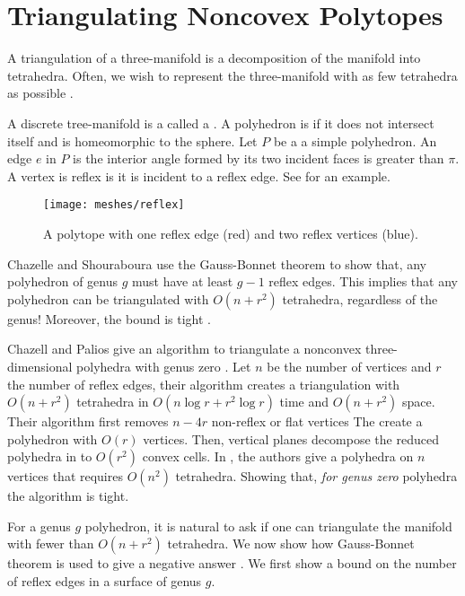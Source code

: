 \section{Triangulating Noncovex Polytopes}
\label{sec:triangulating}

A triangulation of a three-manifold is a decomposition
of the manifold into tetrahedra.
Often, we wish to represent the three-manifold
with as few tetrahedra as possible \cite{simplify-mesh-1999}.

A discrete tree-manifold is a called a . 
A polyhedron is  if it does not intersect itself and is homeomorphic to the sphere.
Let $P$ be a a simple polyhedron. An edge $e$ in $P$ is
 the interior angle formed by its two incident faces
is greater than $\pi$.
A vertex is reflex is it is incident to a reflex edge.
See  for an example.

\begin{figure}[htb]
\centering
\texttt{[image: meshes/reflex]}
\caption{A polytope with one reflex edge (red) and two reflex vertices (blue).}
\label{fig:reflex}
\end{figure}


Chazelle and Shouraboura use the 
 Gauss-Bonnet theorem to show that, any polyhedron
 of genus $g$ must have at least $g-1$ reflex edges.
 This implies that any polyhedron
can be triangulated with $O(n+r^2)$ tetrahedra, regardless  of 
the genus! Moreover, the bound is tight \cite{tetra-bounds-c-s-1994}.


Chazell and Palios give an
algorithm to triangulate a nonconvex three-dimensional polyhedra with genus
zero \cite{triangulating-polytope-1990}.
Let $n$ be the number of vertices and $r$ the number of reflex edges,
 their algorithm creates a triangulation with $O(n+r^2)$ tetrahedra 
in $O(n\log r +r^2\log r)$ time and $O(n+r^2)$ space.
Their algorithm first removes $n-4r$ non-reflex or flat vertices
The create a polyhedron with $O(r)$ vertices.
Then, vertical planes decompose the reduced polyhedra in to
$O(r^2)$ convex cells.
In \cite{7}, the authors give a polyhedra on $n$ vertices that requires
$O(n^2)$ tetrahedra. Showing that, \emph{for genus zero} polyhedra
the algorithm is tight.


For a genus $g$ polyhedron, it is natural to ask if one can 
triangulate the manifold with fewer than $O(n+r^2)$ tetrahedra.
We now show how Gauss-Bonnet theorem is used to give a negative answer 
 \cite{tetra-bounds-c-s-1994}.
We first show a bound on the number of reflex edges
in a surface of genus $g$.


